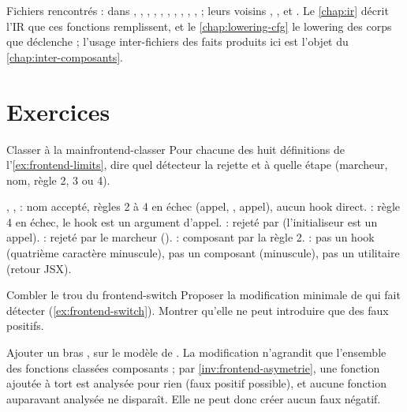 \begin{resume}
\begin{sloppypar}
\begin{itemize}
\end{itemize}
Fichiers rencontrés : dans , , , , , , , , , ,  ; leurs voisins , ,  et . Le \cref{chap:ir} décrit l'IR que ces fonctions remplissent, et le \cref{chap:lowering-cfg} le lowering des corps que  déclenche ; l'usage inter-fichiers des faits produits ici est l'objet du \cref{chap:inter-composants}.
\end{sloppypar}
\end{resume}

\section*{Exercices}

\begin{exercice}{Classer à la main}{frontend-classer}
Pour chacune des huit définitions de l'\cref{ex:frontend-limits}, dire quel détecteur la rejette et à quelle étape (marcheur, nom, règle 2, 3 ou 4).
\end{exercice}
\begin{solution}
, ,  : nom accepté, règles 2 à 4 en échec (appel, , appel), aucun hook direct.  : règle 4 en échec, le hook est un argument d'appel.  : rejeté par  (l'initialiseur est un appel).  : rejeté par le marcheur ().  : composant par la règle 2.  : pas un hook (quatrième caractère minuscule), pas un composant (minuscule), pas un utilitaire (retour JSX).
\end{solution}

\begin{exercice}{Combler le trou du }{frontend-switch}
Proposer la modification minimale de  qui fait détecter  (\cref{ex:frontend-switch}). Montrer qu'elle ne peut introduire que des faux positifs.
\end{exercice}
\begin{solution}
Ajouter un bras , sur le modèle de . La modification n'agrandit que l'ensemble des fonctions classées composants ; par \cref{inv:frontend-asymetrie}, une fonction ajoutée à tort est analysée pour rien (faux positif possible), et aucune fonction auparavant analysée ne disparaît. Elle ne peut donc créer aucun faux négatif.
\end{solution}


